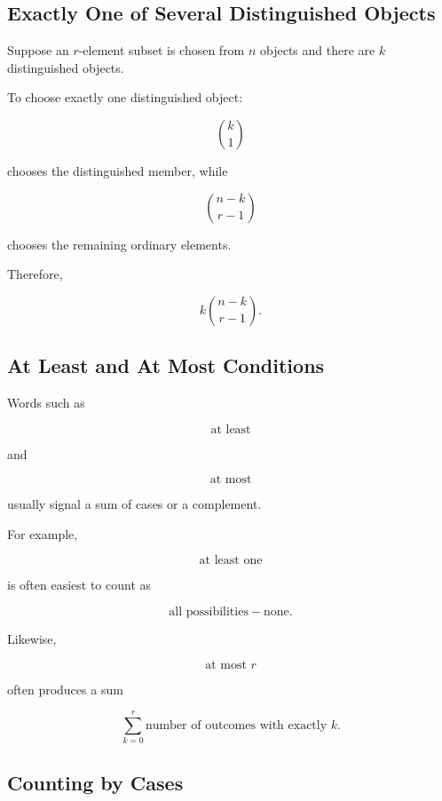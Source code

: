 \subsection{Exactly One of Several Distinguished Objects}
\label{subsec:exactly-one-distinguished}

Suppose an \(r\)-element subset is chosen from \(n\) objects and there
are \(k\) distinguished objects.

To choose exactly one distinguished object:

\[
\binom{k}{1}
\]

chooses the distinguished member, while

\[
\binom{n-k}{r-1}
\]

chooses the remaining ordinary elements.

Therefore,

\[
\boxed{
k\binom{n-k}{r-1}.
}
\]

\subsection{At Least and At Most Conditions}
\label{subsec:at-least-at-most-counting}

Words such as

\[
\text{at least}
\]

and

\[
\text{at most}
\]

usually signal a sum of cases or a complement.

For example,

\[
\text{at least one}
\]

is often easiest to count as

\[
\boxed{
\text{all possibilities}
-
\text{none}.
}
\]

Likewise,

\[
\text{at most }r
\]

often produces a sum

\[
\boxed{
\sum_{k=0}^{r}
\text{number of outcomes with exactly }k.
}
\]

\subsection{Counting by Cases}
\label{subsec:counting-by-cases}

